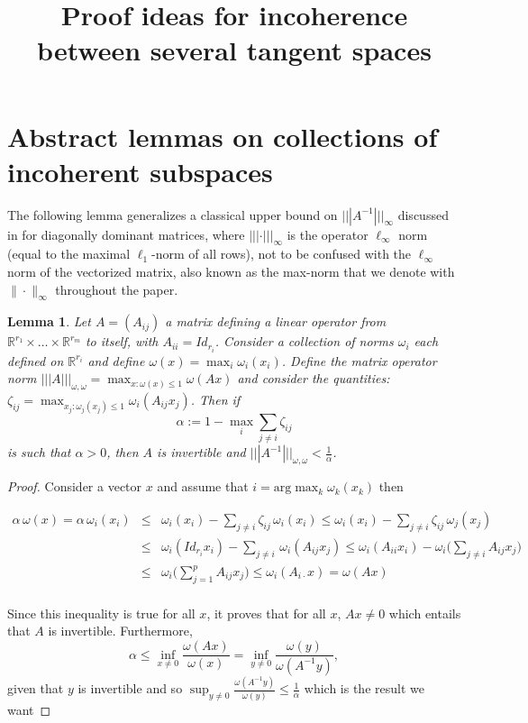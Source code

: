 \documentclass{article}
\title{Proof ideas for incoherence between several tangent spaces}
\date{}
\def\RR{\mathbb{R}}
\def\xxi{\zeta}
\newtheorem{lemma}{Lemma}
\begin{document}
\maketitle
\appendix
\section{Abstract lemmas on collections of incoherent subspaces}
The following lemma generalizes a classical upper bound on $|||A^{-1}|||_{\infty}$ discussed in \citet{varga1976diagonal} for diagonally dominant matrices, where $|||\cdot|||_{\infty}$ is the operator $\ell_\infty$ norm (equal to the maximal $\ell_1$-norm of all rows), not to be confused with the 
$\ell_\infty$ norm of the vectorized matrix, also known as the max-norm that we denote with $\|\cdot\|_{\infty}$ throughout the paper.

\begin{lemma}
\label{lem:gbdd}
Let $A=(A_{ij})$ a matrix defining a linear operator from $\RR^{r_1} \times \ldots \times \RR^{r_m}$ to itself, with $A_{ii}=Id_{r_i}$. Consider a collection of norms $\omega_i$ each defined on $\RR^{r_i}$
and define $\omega(x)=\max_i \omega_i(x_i)$. Define the matrix operator norm $|||A|||_{\omega,\omega}=\max_{x:\omega(x)\leq 1} \omega(Ax)$ and consider the quantities:
$\xxi_{ij}=\max_{x_j:\omega_j(x_j) \leq 1} \omega_i(A_{ij}x_j)$.
Then if 
$$\alpha:=1-\max_{i} \sum_{j \neq i} \xxi_{ij}$$ is such that $\alpha >0$, then $A$ is invertible and $|||A^{-1}|||_{\omega,\omega}< \frac{1}{\alpha}$.
\end{lemma}
\begin{proof}
Consider a vector $x$ and assume that $i=\text{arg} \max_{k} \omega_k(x_k)$ then

\begin{eqnarray*}
\alpha \, \omega(x) =\alpha \, \omega_i(x_i) &\leq & \omega_i(x_i) -\sum_{j\neq i} \xxi_{ij}  \, \omega_i(x_i) \leq \omega_i(x_i) -\sum_{j\neq i} \xxi_{ij}  \, \omega_j(x_j)\\
&\leq& \omega_i(Id_{r_i} x_i) -\sum_{j\neq i} \, \omega_i(A_{ij} x_j)
\leq \omega_i(A_{ii} x_i) -\omega_i \big ( \sum_{j\neq i} A_{ij} x_j \big )\\
&\leq&\omega_i \big ( \sum_{j=1}^p A_{ij} x_j \big )
\leq\omega_i (A_{i\cdot}x)=\omega(A x)\\
\end{eqnarray*}

Since this inequality is true for all $x$, it proves that for all $x$, $Ax\neq0$ which entails that $A$ is invertible.
Furthermore,
$$\alpha\leq \inf_{x\neq 0} \frac{\omega(A x)}{\omega(x)}=\inf_{y\neq 0} \frac{\omega(y)}{\omega(A^{-1}y)},$$
given that $y$ is invertible and so $\sup_{y \neq 0}\frac{\omega(A^{-1}y)}{\omega(y)}\leq \frac{1}{\alpha}$ which is the result we want
\end{proof}
\end{document}
